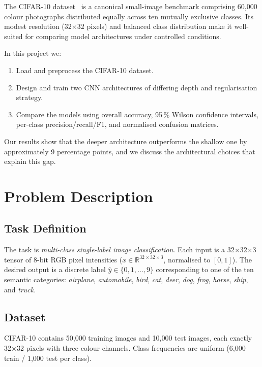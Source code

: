 \documentclass[conference]{IEEEtran}
\begin{document}
The CIFAR-10 dataset~\cite{krizhevsky2009learning} is a canonical small-image
benchmark comprising 60{,}000 colour photographs distributed equally across ten
mutually exclusive classes.
Its modest resolution (32$\times$32 pixels) and balanced class distribution
make it well-suited for comparing model architectures under controlled
conditions.

In this project we:
\begin{enumerate}
  \item Load and preprocess the CIFAR-10 dataset.
  \item Design and train two CNN architectures of differing depth and
        regularisation strategy.
  \item Compare the models using overall accuracy, 95\,\% Wilson confidence
        intervals, per-class precision/recall/F1, and normalised confusion
        matrices.
\end{enumerate}

Our results show that the deeper architecture outperforms the shallow one by
approximately 9 percentage points, and we discuss the architectural choices
that explain this gap.

\section{Problem Description}

\subsection{Task Definition}

The task is \emph{multi-class single-label image classification}.
Each input is a 32$\times$32$\times$3 tensor of 8-bit RGB pixel intensities
($x \in \mathbb{R}^{32 \times 32 \times 3}$, normalised to $[0,1]$).
The desired output is a discrete label $\hat{y} \in \{0, 1, \ldots, 9\}$
corresponding to one of the ten semantic categories:
\emph{airplane}, \emph{automobile}, \emph{bird}, \emph{cat}, \emph{deer},
\emph{dog}, \emph{frog}, \emph{horse}, \emph{ship}, and \emph{truck}.

\subsection{Dataset}

CIFAR-10 contains 50{,}000 training images and 10{,}000 test images, each
exactly 32$\times$32 pixels with three colour channels.
Class frequencies are uniform (6{,}000 train / 1{,}000 test per class).
\end{document}
